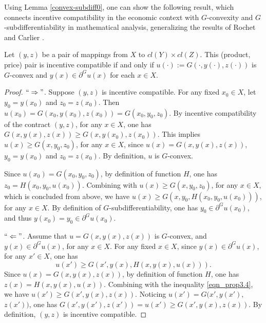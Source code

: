				
Using Lemma \ref{convex-subdiff0}, one can show the following result,  %
which connects incentive compatibility in the economic context with $G$-convexity and $G$-subdifferentiability in mathematical analysis, generalizing the results of Rochet \cite{Rochet87} and Carlier \cite{Carlier01}.
\medskip




\begin{proposition}\label{incen/convex}
	Let $(y,z)$ be a pair of mappings from $X$ to $cl(Y) \times cl(Z)$.  This (product, price) pair is incentive compatible 
	if and only if $u(\cdot):=G(\cdot,y(\cdot),z(\cdot))$ is $G$-convex and $y(x)\in \partial^G u(x)$ for each $x \in X$.
\end{proposition}
					
\begin{proof}%
	$``\Rightarrow"$. Suppose $(y,z)$ is incentive compatible. For any fixed $x_0 \in X$, let $y_0 = y(x_0)$ and $z_0 = z(x_0)$. Then $u(x_0) = G(x_0, y(x_0), z(x_0)) = G(x_0, y_0, z_0)$. By incentive compatibility of the contract $(y,z)$, for any $x\in X$, one has $G(x, y(x), z(x)) \ge G(x, y(x_0), z(x_0))$. This implies $u(x) \ge G(x,y_0,z_0)$, for any $x\in X$, since $u(x)= G(x, y(x), z(x))$,  $y_0 = y(x_0)$ and $z_0 = z(x_0)$. By definition, $u$ is $G$-convex. 
	
	Since $u(x_0)=G(x_0, y_0, z_0)$, by definition of function $H$, one has $z_0 = H(x_0, y_0, u(x_0))$.  Combining with $u(x) \ge G(x, y_0, z_0)$,  for any $x\in X$, which is concluded from above, we have $u(x)\ge G(x, y_0, H(x_0, y_0, u(x_0)))$, for any $x\in X$. By definition of  $G$-subdifferentiability, one has $y_0 \in \partial^G u(x_0)$, and thus $y(x_0) = y_0 \in \partial^G u(x_0)$.
	
	$``\Leftarrow"$. Assume that $u = G(x, y(x),z(x))$ is $G$-convex, and $y(x)\in \partial^G u(x)$, for any $x\in X$. For any fixed $x \in X$, since $y(x)\in \partial^G u(x)$, for any $x'\in X$, one has 
	\begin{equation}\label{eqn_prop3.4}
	u(x')\ge G(x', y(x), H(x, y(x), u(x))).
	\end{equation} 
	Since $u(x) = G(x, y(x),z(x))$, by definition of function $H$, one has $z(x) = H(x,y(x), u(x))$. Combining with the inequality \eqref{eqn_prop3.4}, we have $u(x')\ge G(x', y(x), z(x))$. Noticing $u(x') = G(x',y(x'),$ $z(x')) $, one has $G(x',y(x'),z(x')) = u(x') \ge G(x', y(x), z(x))$.
	By definition, $(y,z)$ is incentive compatible.
\end{proof}












